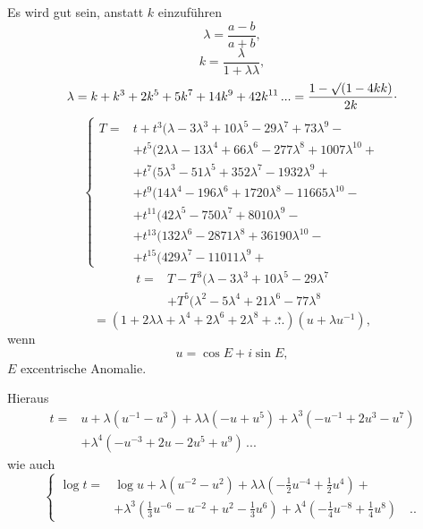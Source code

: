 \begingroup
\makeatletter\tagsleft@true\let\veqno\@@leqno\makeatother
{}
\par\indent Es wird gut sein, anstatt $k$ einzuführen
\begin{equation}
\lambda=\frac{a-b}{a+b},\tag*{[4]}
\end{equation}
\[k=\frac{\lambda}{1+\lambda\lambda},\]
\[
\lambda=k+k^3+2k^5+5k^7+14k^9+42k^{11}\,{.}{.}{.}=\frac{1-\surd(1-4kk)}{2k}\mathpunct{\raisebox{.5ex}{.}}
\]
\begin{equation}
\left\{\begin{aligned}
T={}&t+t^3(\lambda-3\lambda^3+10\lambda^5-29\lambda^7+73\lambda^9-{}\\
&+t^5(2\lambda\lambda-13\lambda^4+66\lambda^6-277\lambda^8+1007\lambda^{10}+{}\\
&+t^7(5\lambda^3-51\lambda^5+352\lambda^7-1932\lambda^9+{}\\
&+t^9(14\lambda^4-196\lambda^6+1720\lambda^8-11665\lambda^{10}-{}\\
&+t^{11}(42\lambda^5-750\lambda^7+8010\lambda^9-{}\\
&+t^{13}(132\lambda^6-2871\lambda^8+36190\lambda^{10}-{}\\
&+t^{15}(429\lambda^7-11011\lambda^9+{}
\end{aligned}\right.\tag*{[5]}
\end{equation}
\[\begin{aligned}
t={}&T-T^3(\lambda-3\lambda^3+10\lambda^5-29\lambda^7\\
&+T^5(\lambda^2-5\lambda^4+21\lambda^6-77\lambda^8
\end{aligned}\]
\begin{equation}
[T]=(1+2\lambda\lambda+\lambda^4+2\lambda^6+2\lambda^8+\overset{\ast}{{.}{.}{.}})(u+\lambda u^{-1}),\tag*{[5a]}
\end{equation}
\noindent wenn
\begin{equation}
u=\cos E+i\sin E,\tag*{[6]}
\end{equation}
\noindent $E$ excentrische Anomalie.
\par\indent Hieraus
\[\begin{aligned}
t={}&u+\lambda(u^{-1}-u^3)+\lambda\lambda(-u+u^5)+\lambda^3(-u^{-1}+2u^3-u^7)\\
&+\lambda^4(-u^{-3}+2u-2u^5+u^9)\,{.}{.}{.}
\end{aligned}\]
\noindent wie auch
{\small\begin{equation}
\left\{\begin{aligned}
\log t={}&\log u+\lambda(u^{-2}-u^2)+\lambda\lambda(-\tfrac12u^{-4}+\tfrac12u^4)+{}\\
&+\lambda^3(\tfrac13u^{-6}-u^{-2}+u^2-\tfrac13u^6)+\lambda^4(-\tfrac14u^{-8}+\tfrac14u^8)\quad{.}{.}
\end{aligned}\right.\tag*{[7]}
\end{equation}}
